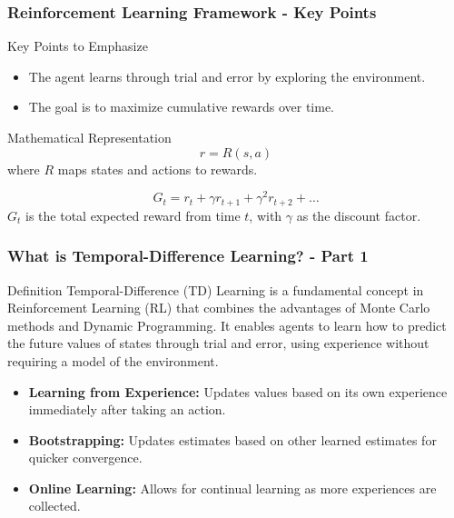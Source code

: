 \documentclass[aspectratio=169]{beamer}
\begin{document}
\begin{frame}[fragile]
    \frametitle{Reinforcement Learning Framework - Key Points}
    \begin{block}{Key Points to Emphasize}
        \begin{itemize}
            \item The agent learns through trial and error by exploring the environment.
            \item The goal is to maximize cumulative rewards over time.
        \end{itemize}
    \end{block}

    \begin{block}{Mathematical Representation}
        \begin{equation}
            r = R(s, a)
        \end{equation}
        where \( R \) maps states and actions to rewards.

        \begin{equation}
            G_t = r_t + \gamma r_{t+1} + \gamma^2 r_{t+2} + \ldots
        \end{equation}
        \( G_t \) is the total expected reward from time \( t \), with \( \gamma \) as the discount factor.
    \end{block}
\end{frame}

\begin{frame}[fragile]
    \frametitle{What is Temporal-Difference Learning? - Part 1}
    \begin{block}{Definition}
        Temporal-Difference (TD) Learning is a fundamental concept in Reinforcement Learning (RL) that combines the advantages of Monte Carlo methods and Dynamic Programming. It enables agents to learn how to predict the future values of states through trial and error, using experience without requiring a model of the environment.
    \end{block}
    
    \begin{itemize}
        \item \textbf{Learning from Experience:} Updates values based on its own experience immediately after taking an action.
        \item \textbf{Bootstrapping:} Updates estimates based on other learned estimates for quicker convergence.
        \item \textbf{Online Learning:} Allows for continual learning as more experiences are collected.
    \end{itemize}
\end{frame}
\end{document}
